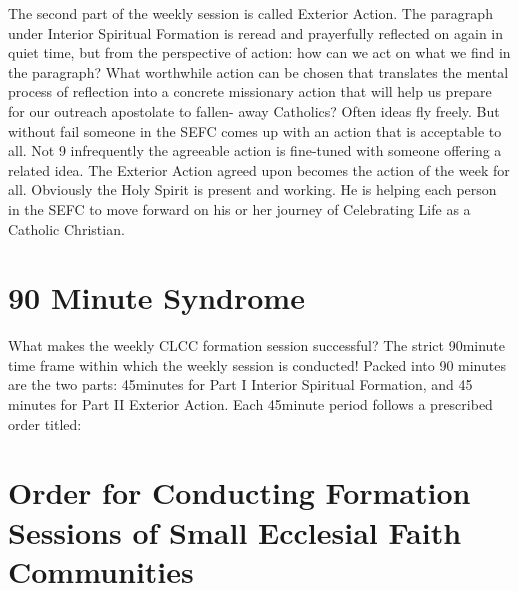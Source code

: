 \documentclass{article}
\begin{document}
The second part of the weekly session is called Exterior Action. The paragraph
under Interior Spiritual Formation is reread and prayerfully reflected on again
in quiet time, but from the perspective of action: how can we act on what we
find in the paragraph? What worthwhile action can be chosen that translates the
mental process of reflection into a concrete missionary action that will help us
prepare for our outreach apostolate to fallen- away Catholics? Often ideas fly
freely. But without fail someone in the SEFC comes up with an action that is
acceptable to all. Not
9
infrequently the agreeable action is fine-tuned with someone offering a related
idea. The Exterior Action agreed upon becomes the action of the week for
all. Obviously the Holy Spirit is present and working. He is helping each person
in the SEFC to move forward on his or her journey of Celebrating Life as a
Catholic Christian.

\section{90 Minute Syndrome}

What makes the weekly CLCC formation session successful? The strict 90minute
time frame within which the weekly session is conducted! Packed into 90 minutes
are the two parts: 45minutes for Part I Interior Spiritual Formation, and 45
minutes for Part II Exterior Action. Each 45minute period follows a prescribed
order titled:

\section{Order for Conducting Formation Sessions of Small Ecclesial Faith Communities}
\end{document}
